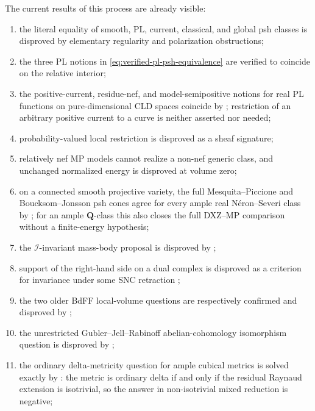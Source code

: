 The current results of this process are already visible:

\begin{enumerate}
\item the literal equality of smooth, PL, current, classical, and global psh
      classes is disproved by elementary regularity and polarization
      obstructions;
\item the three PL notions in
      \eqref{eq:verified-pl-psh-equivalence} are verified to coincide on the
      relative interior;
\item the positive-current, residue-nef, and model-semipositive notions for
      real PL functions on pure-dimensional CLD spaces coincide by
      ; restriction of an
      arbitrary positive current to a curve is neither asserted nor needed;
\item probability-valued local restriction is disproved as a sheaf
      signature;
\item relatively nef MP models cannot realize a non-nef generic class, and
      unchanged normalized energy is disproved at volume zero;
\item on a connected smooth projective variety, the full
      Mesquita--Piccione and Boucksom--Jonsson psh cones agree for every
      ample real N\'eron--Severi class by
      ; for an ample
      \(\mathbf Q\)-class this also closes the full DXZ--MP comparison
      without a finite-energy hypothesis;
\item the \(\mathcal I\)-invariant mass-body proposal is disproved by
      ;
\item support of the right-hand side on a dual complex is disproved as a
      criterion for invariance under some SNC retraction
      \cite{BJGreen24};
\item the two older BdFF local-volume questions are respectively confirmed
      and disproved by \cite{Zhang14LocalVolume};
\item the unrestricted Gubler--Jell--Rabinoff abelian-cohomology isomorphism
      question is disproved by
      ;
\item the ordinary delta-metricity question for ample cubical metrics is
      solved exactly by : the metric
      is ordinary delta if and only if the residual Raynaud extension is
      isotrivial, so the answer in non-isotrivial mixed reduction is
      negative;

\end{enumerate}
